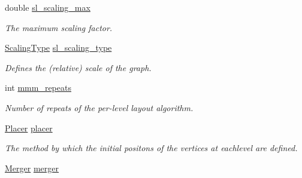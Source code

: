 \begin{DoxyCompactItemize}
\mbox{\label{structtmap_1_1LayoutConfiguration_aa29669e99b7e1df2bcb95d6379da7cc3}} 
double \hyperlink{structtmap_1_1LayoutConfiguration_aa29669e99b7e1df2bcb95d6379da7cc3}{sl\+\_\+scaling\+\_\+max}
\begin{DoxyCompactList}\small\item\em The maximum scaling factor. \end{DoxyCompactList}\item 
\mbox{\label{structtmap_1_1LayoutConfiguration_a618d286e035eca76e0e464513624beec}} 
\hyperlink{layout_8hh_a50ec215c9e54cf12b9dd0a0056160761}{Scaling\+Type} \hyperlink{structtmap_1_1LayoutConfiguration_a618d286e035eca76e0e464513624beec}{sl\+\_\+scaling\+\_\+type}
\begin{DoxyCompactList}\small\item\em Defines the (relative) scale of the graph. \end{DoxyCompactList}\item 
\mbox{\label{structtmap_1_1LayoutConfiguration_aff2347eb71c98bbc72f16b4de32d4af0}} 
int \hyperlink{structtmap_1_1LayoutConfiguration_aff2347eb71c98bbc72f16b4de32d4af0}{mmm\+\_\+repeats}
\begin{DoxyCompactList}\small\item\em Number of repeats of the per-\/level layout algorithm. \end{DoxyCompactList}\item 
\mbox{\label{structtmap_1_1LayoutConfiguration_ae81108ee33f42b2c084b540f902bbb7d}} 
\hyperlink{layout_8hh_afdc98947e81dc6f4c30f256e6f42f90b}{Placer} \hyperlink{structtmap_1_1LayoutConfiguration_ae81108ee33f42b2c084b540f902bbb7d}{placer}
\begin{DoxyCompactList}\small\item\em The method by which the initial positons of the vertices at eachlevel are defined. \end{DoxyCompactList}\item 
\mbox{\label{structtmap_1_1LayoutConfiguration_aeee45308fd8dbda38fbc7b8c7ff9212f}} 
\hyperlink{layout_8hh_a8c7bb9956a1a724233182a166cfdc0ff}{Merger} \hyperlink{structtmap_1_1LayoutConfiguration_aeee45308fd8dbda38fbc7b8c7ff9212f}{merger}

\end{DoxyCompactItemize}
